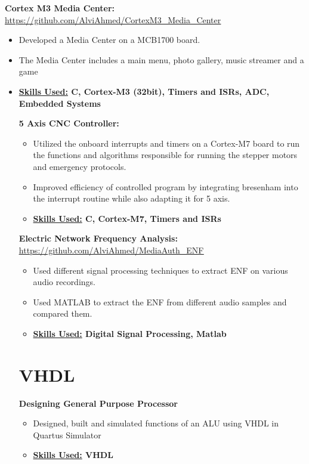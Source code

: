 \textbf{Cortex M3 Media Center: } 
\underline{\url{https://github.com/AlviAhmed/CortexM3_Media_Center}}
\begin{itemize}[noitemsep,nolistsep]
\item Developed a Media Center on a MCB1700 board.
\item The Media Center includes a main menu, photo gallery, music streamer and a game 
\item \textbf{ \underline{Skills Used:} C, Cortex-M3 (32bit), Timers and ISRs, ADC,
    Embedded Systems}

  
\textbf{5 Axis CNC Controller: } 
\begin{itemize}[noitemsep,nolistsep]
\item Utilized the onboard interrupts and timers on a Cortex-M7 board to run
  the functions and algorithms responsible for running the stepper motors and emergency protocols.
\item Improved efficiency of controlled program by integrating bresenham into the
  interrupt routine while also adapting it for 5 axis.
\item \textbf{ \underline{Skills Used:} C, Cortex-M7, Timers and ISRs}
\end{itemize}


\textbf{Electric Network Frequency Analysis: }
\underline{\url{https://github.com/AlviAhmed/MediaAuth_ENF}}
\begin{itemize}[noitemsep,nolistsep]
\item Used different signal processing techniques to extract ENF on various audio recordings.
\item Used MATLAB to extract the ENF from different audio samples and compared them.
\item \textbf{\underline{Skills Used:} Digital Signal Processing, Matlab}
\end{itemize}


\section*{VHDL}


\textbf{Designing General Purpose Processor} 
\begin{itemize}[noitemsep,nolistsep]
\item Designed, built and simulated functions of an ALU using VHDL in Quartus Simulator
\item \textbf{ \underline{Skills Used:} VHDL}
\end{itemize}



\end{itemize}
